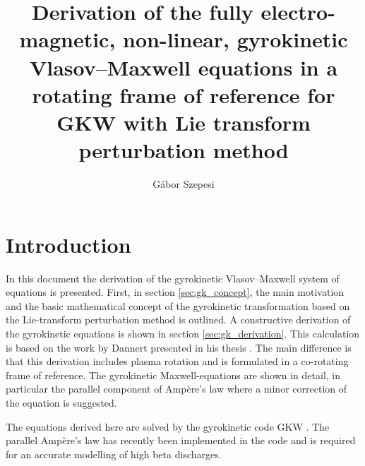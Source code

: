 \documentclass[a4paper,10pt]{article}
\title{Derivation of the fully electro-magnetic, non-linear, gyrokinetic Vlasov--Maxwell equations in a rotating frame of reference for GKW with Lie transform perturbation method}
\author{G\'abor Szepesi}
\begin{document}
\maketitle


\tableofcontents

\newpage




\section{Introduction}
In this document the derivation of the gyrokinetic Vlasov--Maxwell system of equations is presented. First, in section \ref{sec:gk_concept}, the main motivation and the basic mathematical concept of the gyrokinetic transformation based on the Lie-transform perturbation method is outlined. A constructive derivation of the gyrokinetic equations is shown in section \ref{sec:gk_derivation}. This calculation is based on the work by Dannert presented in his thesis \cite{dannert}. The main difference is that this derivation includes plasma rotation and is formulated in a co-rotating frame of reference. The gyrokinetic Maxwell-equations are shown in detail, in particular the parallel component of Amp\`ere's law where a minor correction of the equation is suggested. 

The equations derived here are solved by the gyrokinetic code GKW \cite{gkw}. The parallel Amp\`ere's law has recently been implemented in the code and is required for an accurate modelling of high beta discharges. 

\end{document}
